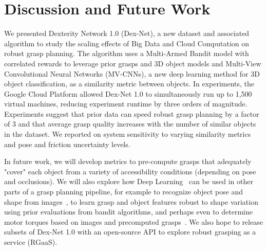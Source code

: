 \section{Discussion and Future Work}
We presented Dexterity Network 1.0 (Dex-Net), a new dataset and associated algorithm to study the scaling effects of Big Data and Cloud Computation on robust grasp planning.
The algorithm uses a Multi-Armed Bandit model with correlated rewards to leverage prior grasps and 3D object models and Multi-View Convolutional Neural Networks (MV-CNNs), a new deep learning method for 3D object classification, as a similarity metric between objects.
In experiments, the Google Cloud Platform allowed Dex-Net 1.0 to simultaneously run up to 1,500 virtual machines, reducing experiment runtime by three orders of magnitude.
Experiments suggest that prior data can speed robust grasp planning by a factor of 3 and that average grasp quality increases with the number of similar objects in the dataset.
We reported on system sensitivity to varying similarity metrics and pose and friction uncertainty levels.

In future work, we will develop metrics to pre-compute grasps that adequately "cover" each object from a variety of accessibility conditions (depending on pose and occlusions).
We will also explore how Deep Learning~\cite{krizhevsky2012imagenet} can be used in other parts of a grasp planning pipeline, for example to recognize object pose and shape from images~\cite{aubry2015understanding}, to learn grasp and object features robust to shape variation using prior evaluations from bandit algorithms, and perhaps even to determine motor torques based on images and precomputed grasps~\cite{levine2015end}.
We also hope to release subsets of Dex-Net 1.0 with an open-source API to explore robust grasping as a service (RGaaS).

